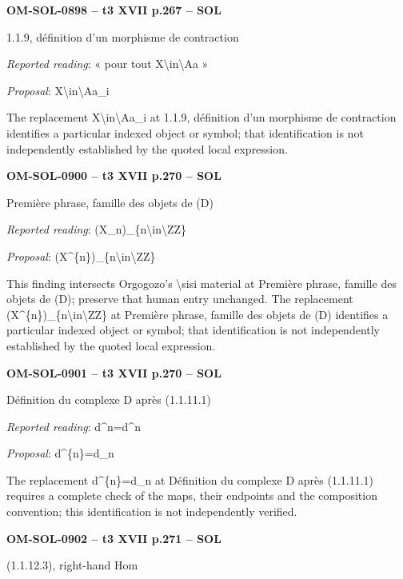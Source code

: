 \par\noindent\textbf{OM-SOL-0898 -- t3 XVII p.267 -- SOL}\par
1.1.9, définition d'un morphisme de contraction\par
\emph{Reported reading}: « pour tout X\textbackslash{}in\textbackslash{}Aa »\par
\emph{Proposal}: X\textbackslash{}in\textbackslash{}Aa\_i\par
The replacement X\textbackslash{}in\textbackslash{}Aa\_i at 1.1.9, définition d'un morphisme de contraction identifies a particular indexed object or symbol; that identification is not independently established by the quoted local expression.\par
\par\noindent\textbf{OM-SOL-0900 -- t3 XVII p.270 -- SOL}\par
Première phrase, famille des objets de (D)\par
\emph{Reported reading}: (X\_n)\_\{n\textbackslash{}in\textbackslash{}ZZ\}\par
\emph{Proposal}: (X\textasciicircum{}\{n\})\_\{n\textbackslash{}in\textbackslash{}ZZ\}\par
This finding intersects Orgogozo's \textbackslash{}sisi material at Première phrase, famille des objets de (D); preserve that human entry unchanged. The replacement (X\textasciicircum{}\{n\})\_\{n\textbackslash{}in\textbackslash{}ZZ\} at Première phrase, famille des objets de (D) identifies a particular indexed object or symbol; that identification is not independently established by the quoted local expression.\par
\par\noindent\textbf{OM-SOL-0901 -- t3 XVII p.270 -- SOL}\par
Définition du complexe D après (1.1.11.1)\par
\emph{Reported reading}: d\textasciicircum{}n=\allowbreak d\textasciicircum{}n\par
\emph{Proposal}: d\textasciicircum{}\{n\}=\allowbreak d\_n\par
The replacement d\textasciicircum{}\{n\}=\allowbreak d\_n at Définition du complexe D après (1.1.11.1) requires a complete check of the maps, their endpoints and the composition convention; this identification is not independently verified.\par
\par\noindent\textbf{OM-SOL-0902 -- t3 XVII p.271 -- SOL}\par
(1.1.12.3), right-hand Hom\par
